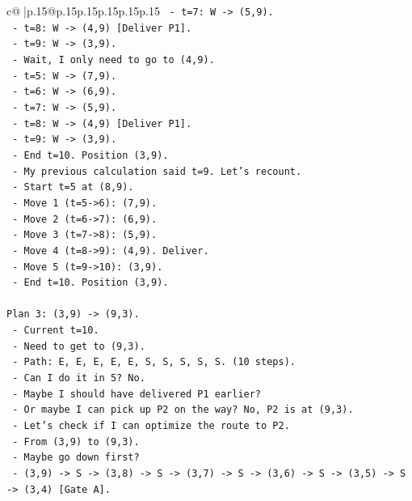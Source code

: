 \documentclass{article}
\begin{document}
{\begin{supertabular}{c@{$\;$}|p{.15\linewidth}@{}p{.15\linewidth}p{.15\linewidth}p{.15\linewidth}p{.15\linewidth}p{.15\linewidth}}
{{{\texttt{  {-} t=7: W {-}> (5,9).} \\
\texttt{  {-} t=8: W {-}> (4,9) {[}Deliver P1{]}.} \\
\texttt{  {-} t=9: W {-}> (3,9).} \\
\texttt{  {-} Wait, I only need to go to (4,9).} \\
\texttt{  {-} t=5: W {-}> (7,9).} \\
\texttt{  {-} t=6: W {-}> (6,9).} \\
\texttt{  {-} t=7: W {-}> (5,9).} \\
\texttt{  {-} t=8: W {-}> (4,9) {[}Deliver P1{]}.} \\
\texttt{  {-} t=9: W {-}> (3,9).} \\
\texttt{  {-} End t=10. Position (3,9).} \\
\texttt{  {-} My previous calculation said t=9. Let's recount.} \\
\texttt{  {-} Start t=5 at (8,9).} \\
\texttt{  {-} Move 1 (t=5{-}>6): (7,9).} \\
\texttt{  {-} Move 2 (t=6{-}>7): (6,9).} \\
\texttt{  {-} Move 3 (t=7{-}>8): (5,9).} \\
\texttt{  {-} Move 4 (t=8{-}>9): (4,9). Deliver.} \\
\texttt{  {-} Move 5 (t=9{-}>10): (3,9).} \\
\texttt{  {-} End t=10. Position (3,9).} \\
\\ 
\texttt{Plan 3: (3,9) {-}> (9,3).} \\
\texttt{  {-} Current t=10.} \\
\texttt{  {-} Need to get to (9,3).} \\
\texttt{  {-} Path: E, E, E, E, E, S, S, S, S, S. (10 steps).} \\
\texttt{  {-} Can I do it in 5? No.} \\
\texttt{  {-} Maybe I should have delivered P1 earlier?} \\
\texttt{  {-} Or maybe I can pick up P2 on the way? No, P2 is at (9,3).} \\
\texttt{  {-} Let's check if I can optimize the route to P2.} \\
\texttt{  {-} From (3,9) to (9,3).} \\
\texttt{  {-} Maybe go down first?} \\
\texttt{  {-} (3,9) {-}> S {-}> (3,8) {-}> S {-}> (3,7) {-}> S {-}> (3,6) {-}> S {-}> (3,5) {-}> S {-}> (3,4) {[}Gate A{]}.} \\
}}}
\end{supertabular}}
\end{document}
